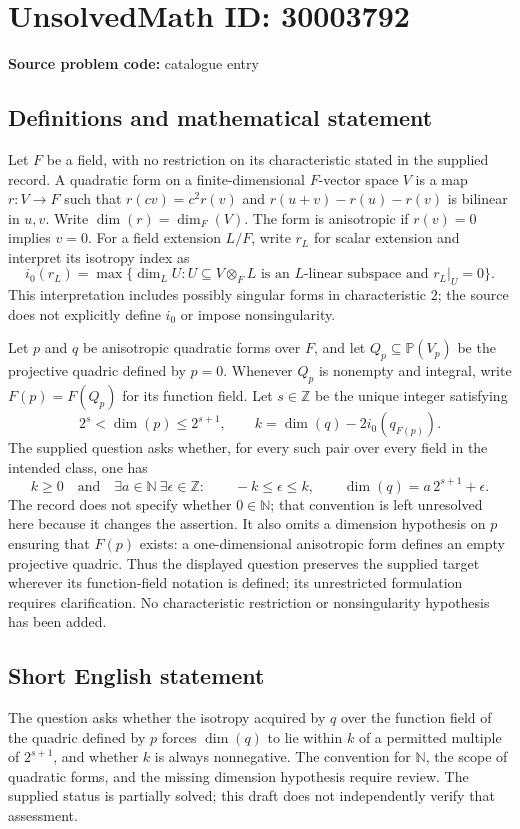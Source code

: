 \documentclass[11pt]{article}
\newcommand{\Z}{\mathbb{Z}}
\newcommand{\PP}{\mathbb{P}}
\begin{document}
\section*{UnsolvedMath ID: 30003792}
\textbf{Source problem code:} catalogue entry
\subsection{Definitions and mathematical statement}
Let \(F\) be a field, with no restriction on its characteristic stated in the supplied record. A quadratic form on a finite-dimensional \(F\)-vector space \(V\) is a map \(r:V\to F\) such that \(r(cv)=c^2r(v)\) and \(r(u+v)-r(u)-r(v)\) is bilinear in \(u,v\). Write \(\dim(r)=\dim_F(V)\). The form is anisotropic if \(r(v)=0\) implies \(v=0\). For a field extension \(L/F\), write \(r_L\) for scalar extension and interpret its isotropy index as
\[
i_0(r_L)=\max\{\dim_L U: U\subseteq V\otimes_F L\text{ is an }L\text{-linear subspace and }r_L|_U=0\}.
\]
This interpretation includes possibly singular forms in characteristic \(2\); the source does not explicitly define \(i_0\) or impose nonsingularity.

Let \(p\) and \(q\) be anisotropic quadratic forms over \(F\), and let \(Q_p\subseteq\PP(V_p)\) be the projective quadric defined by \(p=0\). Whenever \(Q_p\) is nonempty and integral, write \(F(p)=F(Q_p)\) for its function field. Let \(s\in\Z\) be the unique integer satisfying
\[
2^s<\dim(p)\leq 2^{s+1},
\qquad
k=\dim(q)-2i_0(q_{F(p)}).
\]
The supplied question asks whether, for every such pair over every field in the intended class, one has
\[
k\geq0
\quad\text{and}\quad
\exists a\in\mathbb N\ \exists\epsilon\in\Z:\qquad
-k\leq\epsilon\leq k,
\qquad
\dim(q)=a\,2^{s+1}+\epsilon.
\]
The record does not specify whether \(0\in\mathbb N\); that convention is left unresolved here because it changes the assertion. It also omits a dimension hypothesis on \(p\) ensuring that \(F(p)\) exists: a one-dimensional anisotropic form defines an empty projective quadric. Thus the displayed question preserves the supplied target wherever its function-field notation is defined; its unrestricted formulation requires clarification. No characteristic restriction or nonsingularity hypothesis has been added.
\subsection{Short English statement}
The question asks whether the isotropy acquired by \(q\) over the function field of the quadric defined by \(p\) forces \(\dim(q)\) to lie within \(k\) of a permitted multiple of \(2^{s+1}\), and whether \(k\) is always nonnegative. The convention for \(\mathbb N\), the scope of quadratic forms, and the missing dimension hypothesis require review. The supplied status is partially solved; this draft does not independently verify that assessment.
\end{document}
